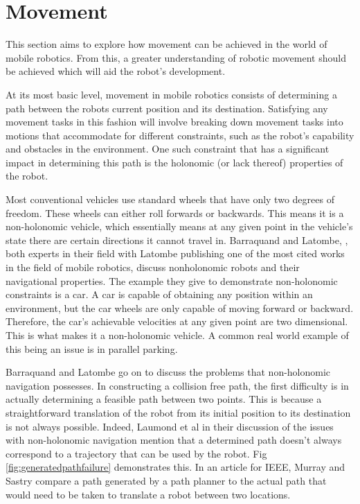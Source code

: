 			\section{Movement}
			This section aims to explore how movement can be achieved in the world of mobile robotics. From this, a greater understanding of robotic movement should be achieved which will aid the robot's development.
			
			At its most basic level, movement in mobile robotics consists of determining a path between the robots current position and its destination. Satisfying any movement tasks in this fashion will involve breaking down movement tasks into motions that accommodate for different constraints, such as the robot's capability and obstacles in the environment. One such constraint that has a significant impact in determining this path is the holonomic (or lack thereof) properties of the robot.
			
			Most conventional vehicles use standard wheels that have only two degrees of freedom. These wheels can either roll forwards or backwards. This means it is a non-holonomic vehicle, which essentially means at any given point in the vehicle's state there are certain directions it cannot travel in. Barraquand and Latombe, \citep{barraquand1989nonholonomic}, both experts in their field with Latombe publishing one of the most cited works in the field of mobile robotics, discuss nonholonomic robots and their navigational properties. The example they give to demonstrate non-holonomic constraints is a car. A car is capable of obtaining any position within an environment, but the car wheels are only capable of moving forward or backward. Therefore, the car's achievable velocities at any given point are two dimensional. This is what makes it a non-holonomic vehicle. A common real world example of this being an issue is in parallel parking.
			
			Barraquand and Latombe go on to discuss the problems that non-holonomic navigation possesses. In constructing a collision free path, the first difficulty is in actually determining a feasible path between two points. This is because a straightforward translation of the robot from its initial position to its destination is not always possible. Indeed, Laumond et al\citep{laumond1994motion} in their discussion of the issues with non-holonomic navigation mention that a determined path doesn't always correspond to a trajectory that can be used by the robot. Fig \ref{fig:generatedpathfailure} demonstrates this. In an article for IEEE, Murray and Sastry\citep{murray1993nonholonomic} compare a path generated by a path planner to the actual path that would need to be taken to translate a robot between two locations.
			
